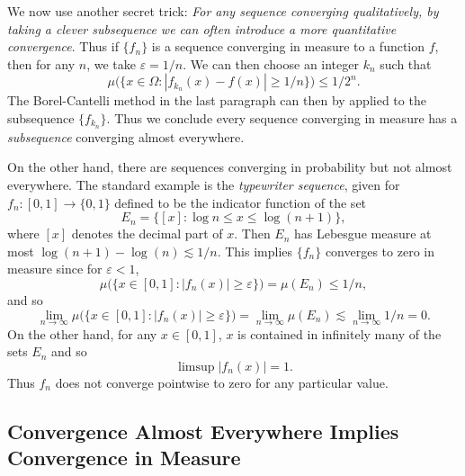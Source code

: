 \documentclass[answers]{exam}
\theoremstyle{problemstyle}
\newcommand{\1}[1]{\textbf{1}_{\left[#1\right]}} %
\begin{document}
We now use another secret trick: \emph{For any sequence converging qualitatively, by taking a clever subsequence we can often introduce a more quantitative convergence}. Thus if $\{ f_n \}$ is a sequence converging in measure to a function $f$, then for any $n$, we take $\varepsilon = 1/n$. We can then choose an integer $k_n$ such that
%
\[ \mu \Big( \{ x \in \Omega: |f_{k_n}(x) - f(x)| \geq 1/n \} \Big) \leq 1/2^n. \]
%
The Borel-Cantelli method in the last paragraph can then by applied to the subsequence $\{ f_{k_n} \}$. Thus we conclude every sequence converging in measure has a \emph{subsequence} converging almost everywhere.

On the other hand, there are sequences converging in probability but not almost everywhere. The standard example is the \emph{typewriter sequence}, given for $f_n: [0,1] \to \{ 0, 1 \}$ defined to be the indicator function of the set
%
\[ E_n = \{ [x] : \log n \leq x \leq \log(n+1) \}, \]
%
where $[x]$ denotes the decimal part of $x$. Then $E_n$ has Lebesgue measure at most $\log(n+1) - \log(n) \lesssim 1/n$. This implies $\{ f_n \}$ converges to zero in measure since for $\varepsilon < 1$,
%
\[ \mu \Big( \{ x \in [0,1]: |f_n(x)| \geq \varepsilon \} \Big) = \mu(E_n) \leq 1/n, \]
%
and so
%
\[ \lim_{n \to \infty} \mu \Big( \{ x \in [0,1]: |f_n(x)| \geq \varepsilon \} \Big) = \lim_{n \to \infty} \mu(E_n) \lesssim \lim_{n \to \infty} 1/n = 0. \]
%
On the other hand, for any $x \in [0,1]$, $x$ is contained in infinitely many of the sets $E_n$ and so
%
\[ \limsup |f_n(x)| = 1. \]
%
Thus $f_n$ does not converge pointwise to zero for any particular value.

\subsection*{Convergence Almost Everywhere Implies Convergence in Measure}
\end{document}
